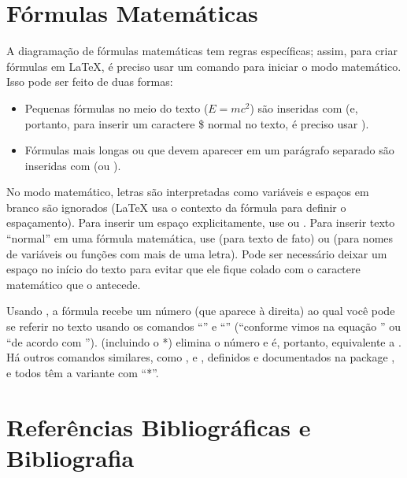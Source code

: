 \section{Fórmulas Matemáticas}

A diagramação de fórmulas matemáticas tem regras específicas; assim, para
criar fórmulas em \LaTeX{}, é preciso usar um comando para iniciar o modo
matemático. Isso pode ser feito de duas formas:

\begin{itemize}
  \item Pequenas fórmulas no meio do texto ($E=mc^2$) são inseridas com
   (e, portanto, para inserir um caractere \$
  normal no texto, é preciso usar \cmd{\sla{}\$}).

  \item Fórmulas mais longas ou que devem aparecer em um parágrafo
  separado são inseridas com  (ou
  ).
\end{itemize}

No modo matemático, letras são interpretadas como variáveis e espaços
em branco são ignorados (\LaTeX{} usa o contexto da fórmula para
definir o espaçamento). Para inserir um espaço explicitamente, use
 ou . Para inserir texto ``normal'' em
uma fórmula matemática, use  (para texto de fato)
ou  (para nomes de variáveis ou funções com
mais de uma letra). Pode ser necessário deixar um espaço no início do
texto para evitar que ele fique colado com o caractere matemático que
o antecede.

Usando , a fórmula recebe um número (que
aparece à direita) ao qual você pode se referir no texto usando os
comandos ``'' e ``'' (``\textsf{conforme
vimos na equação }'' ou
``\textsf{de acordo com }'').
 (incluindo o *) elimina o número e é,
portanto, equivalente a . Há outros
comandos similares, como ,  e ,
definidos e documentados na package , e todos têm
a variante com ``*''.

\section{Referências Bibliográficas e Bibliografia}

